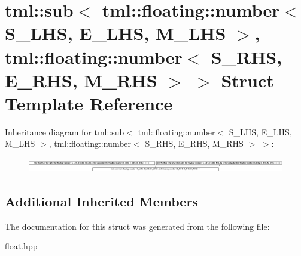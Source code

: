 \hypertarget{structtml_1_1sub_3_01tml_1_1floating_1_1number_3_01S__LHS_00_01E__LHS_00_01M__LHS_01_4_00_01tml_5326d93f85aa375c84a5eb64aa11a05c}{\section{tml\+:\+:sub$<$ tml\+:\+:floating\+:\+:number$<$ S\+\_\+\+L\+H\+S, E\+\_\+\+L\+H\+S, M\+\_\+\+L\+H\+S $>$, tml\+:\+:floating\+:\+:number$<$ S\+\_\+\+R\+H\+S, E\+\_\+\+R\+H\+S, M\+\_\+\+R\+H\+S $>$ $>$ Struct Template Reference}
\label{structtml_1_1sub_3_01tml_1_1floating_1_1number_3_01S__LHS_00_01E__LHS_00_01M__LHS_01_4_00_01tml_5326d93f85aa375c84a5eb64aa11a05c}
}
Inheritance diagram for tml\+:\+:sub$<$ tml\+:\+:floating\+:\+:number$<$ S\+\_\+\+L\+H\+S, E\+\_\+\+L\+H\+S, M\+\_\+\+L\+H\+S $>$, tml\+:\+:floating\+:\+:number$<$ S\+\_\+\+R\+H\+S, E\+\_\+\+R\+H\+S, M\+\_\+\+R\+H\+S $>$ $>$\+:\begin{figure}[H]
\begin{center}
\leavevmode
\includegraphics[height=0.627100cm]{structtml_1_1sub_3_01tml_1_1floating_1_1number_3_01S__LHS_00_01E__LHS_00_01M__LHS_01_4_00_01tml_5326d93f85aa375c84a5eb64aa11a05c}
\end{center}
\end{figure}
\subsection*{Additional Inherited Members}


The documentation for this struct was generated from the following file\+:\begin{DoxyCompactItemize}
\item 
float.\+hpp\end{DoxyCompactItemize}
